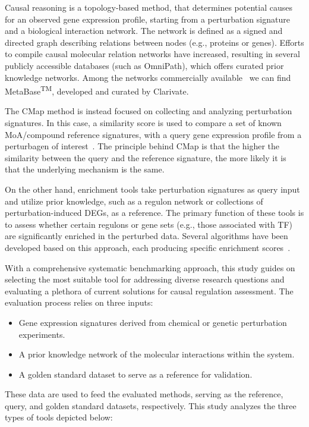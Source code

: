 Causal reasoning is a topology-based method, that determines potential causes for an observed gene expression profile, starting from a perturbation signature and a biological interaction network. 
The network is defined as a signed and directed graph describing relations between nodes (e.g., proteins or genes). 
Efforts to compile causal molecular relation networks have increased, resulting in several publicly accessible databases (such as OmniPath), which offers curated prior knowledge networks. 
Among the networks commercially available~\cite{RN32} we can find MetaBase\textsuperscript{TM}, developed and curated by Clarivate.

The \gls{CMap} method is instead focused on collecting and analyzing perturbation signatures. 
In this case, a similarity score is used to compare a set of known MoA/compound reference signatures, with a query gene expression profile from a perturbagen of interest~\cite{RN34, RN31}.
The principle behind \gls{CMap} is that the higher the similarity between the query and the reference signature, the more likely it is that the underlying mechanism is the same. 

On the other hand, enrichment tools take perturbation signatures as query input and utilize prior knowledge, such as a regulon network or collections of perturbation-induced \gls{DEGs}, as a reference. 
The primary function of these tools is to assess whether certain regulons or gene sets (e.g., those associated with \gls{TF}) are significantly enriched in the perturbed data. 
Several algorithms have been developed based on this approach, each producing specific enrichment scores~\cite{RN35}.

With a comprehensive systematic benchmarking approach, this study guides on selecting the most suitable tool for addressing diverse research questions and evaluating a plethora of current solutions for causal regulation assessment. 
The evaluation process relies on three inputs:

\begin{itemize}
  \item Gene expression signatures derived from chemical or genetic perturbation experiments.
  \item A prior knowledge network of the molecular interactions within the system. 
  \item A golden standard dataset to serve as a reference for validation.
\end{itemize}

These data are used to feed the evaluated methods, serving as the reference, query, and golden standard datasets, respectively. 
This study analyzes the three types of tools depicted below: 

